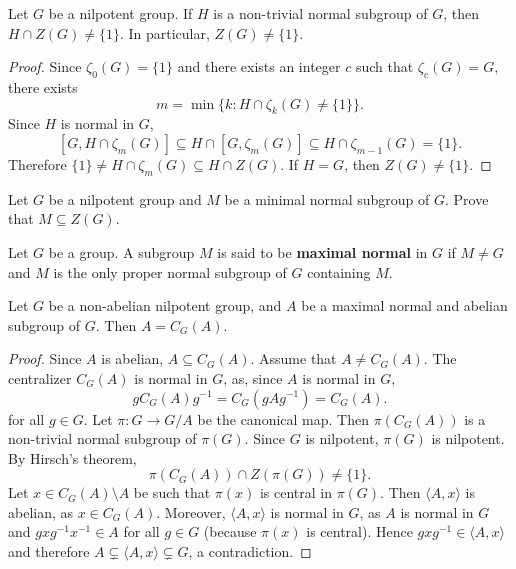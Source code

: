 \begin{theorem}[Hirsch]
\label{thm:Hirsch}
Let $G$ be a nilpotent group. If $H$ is a non-trivial normal subgroup of $G$, 
then $H\cap Z(G)\ne\{1\}$. In particular, $Z(G)\ne\{1\}$. 
\end{theorem}

\begin{proof}
Since $\zeta_0(G)=\{1\}$ and there exists an integer $c$ such that $\zeta_c(G)=G$, 
there exists 
\[
m=\min\{k:H\cap\zeta_k(G)\ne\{1\}\}.
\]
Since $H$ is normal in $G$, 
\[
[G,H\cap\zeta_m(G)]\subseteq H\cap[G,\zeta_m(G)]\subseteq H\cap\zeta_{m-1}(G)=\{1\}.
\]
Therefore $\{1\}\ne H\cap\zeta_m(G)\subseteq H\cap Z(G)$. If $H=G$, then $Z(G)\ne\{1\}$. 
\end{proof}

\begin{exercise}
\label{xca:nilpotente_minimalnormal}
Let $G$ be a nilpotent group and $M$ be a minimal normal subgroup of $G$. Prove 
that $M\subseteq Z(G)$.
\end{exercise}


\begin{definition}
    Let $G$ be a group. A subgroup $M$ is said to be \textbf{maximal normal} in $G$
    if $M\ne G$ and $M$ is the only proper normal subgroup of $G$ containing $M$. 
\end{definition}

\begin{corollary}
Let $G$ be a non-abelian nilpotent group, and $A$ be a maximal normal and abelian 
subgroup of $G$. Then $A=C_G(A)$.
\end{corollary}

\begin{proof}
Since $A$ is abelian, $A\subseteq C_G(A)$. Assume that $A\ne C_G(A)$.
The centralizer $C_G(A)$ is normal in $G$, as, since $A$ is normal in $G$, 
\[
gC_G(A)g^{-1}=C_G(gAg^{-1})=C_G(A).
\]
for all $g\in G$. Let $\pi\colon G\to G/A$ be the canonical map. 
Then $\pi(C_G(A))$ is a non-trivial normal subgroup of $\pi(G)$. Since 
$G$ is nilpotent, $\pi(G)$ is nilpotent. By Hirsch's theorem, 
\[
\pi(C_G(A))\cap Z(\pi(G))\ne\{1\}.
\]
Let $x\in C_G(A)\setminus A$ be such that $\pi(x)$ is central in $\pi(G)$.  Then 
$\langle A,x\rangle$ is abelian, as $x\in C_G(A)$. Moreover,  $\langle
A,x\rangle$ is normal in $G$, as $A$ is normal in $G$ and 
$gxg^{-1}x^{-1}\in A$ for all  $g\in G$ (because $\pi(x)$ is central). Hence
	$gxg^{-1}\in \langle A,x\rangle$ and therefore $A\subsetneq \langle
	A,x\rangle\subsetneq G$, a contradiction.
\end{proof}

